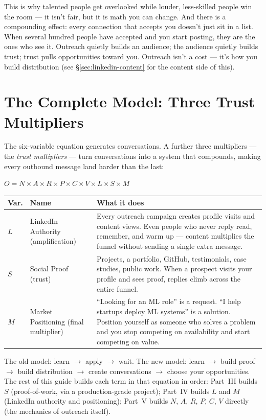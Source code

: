 This is why talented people get overlooked while louder, less-skilled people win the room --- it isn't fair, but
it is math you can change. And there is a compounding effect: every connection that accepts you doesn't just sit
in a list. When several hundred people have accepted and you start posting, they are the ones who see it. Outreach
quietly builds an audience; the audience quietly builds trust; trust pulls opportunities toward you. Outreach
isn't a cost --- it's how you build distribution (see \S\ref{sec:linkedin-content} for the content side of this).

\section{The Complete Model: Three Trust Multipliers}

The six-variable equation generates conversations. A further three multipliers --- the \emph{trust multipliers}
--- turn conversations into a system that compounds, making every outbound message land harder than the last:

\begin{center}
\large $O = N \times A \times R \times P \times C \times V \times L \times S \times M$
\end{center}

\begin{longtable}{p{} p{} p{}}
\toprule
\textbf{Var.} & \textbf{Name} & \textbf{What it does} \\
\midrule
\endhead
$L$ & LinkedIn Authority (amplification) & Every outreach campaign creates profile visits and content views.
Even people who never reply read, remember, and warm up --- content multiplies the funnel without sending a
single extra message. \\
$S$ & Social Proof (trust) & Projects, a portfolio, GitHub, testimonials, case studies, public work. When a
prospect visits your profile and sees proof, replies climb across the entire funnel. \\
$M$ & Market Positioning (final multiplier) & ``Looking for an ML role'' is a request. ``I help startups deploy ML
systems'' is a solution. Position yourself as someone who solves a problem and you stop competing on availability
and start competing on value. \\
\bottomrule
\end{longtable}

\begin{keytakeaway}
The old model: learn $\rightarrow$ apply $\rightarrow$ wait. The new model: learn $\rightarrow$ build proof
$\rightarrow$ build distribution $\rightarrow$ create conversations $\rightarrow$ choose your opportunities. The
rest of this guide builds each term in that equation in order: Part~III builds $S$ (proof-of-work, via a
production-grade project); Part~IV builds $L$ and $M$ (LinkedIn authority and positioning); Part~V builds
$N$, $A$, $R$, $P$, $C$, $V$ directly (the mechanics of outreach itself).
\end{keytakeaway}

